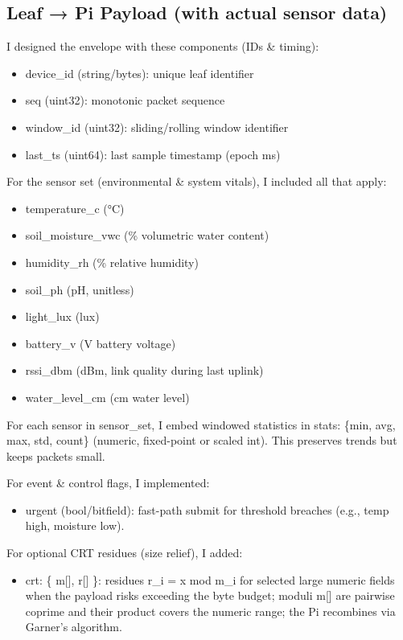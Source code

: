 \documentclass[12pt]{article}
\begin{document}
\subsection{Leaf → Pi Payload (with actual sensor data)}

I designed the envelope with these components (IDs \& timing):

\begin{itemize}
\item device\_id (string/bytes): unique leaf identifier
\item seq (uint32): monotonic packet sequence
\item window\_id (uint32): sliding/rolling window identifier
\item last\_ts (uint64): last sample timestamp (epoch ms)
\end{itemize}

For the sensor set (environmental \& system vitals), I included all that apply:

\begin{itemize}
\item temperature\_c (°C)
\item soil\_moisture\_vwc (\% volumetric water content)
\item humidity\_rh (\% relative humidity)
\item soil\_ph (pH, unitless)
\item light\_lux (lux)
\item battery\_v (V battery voltage)
\item rssi\_dbm (dBm, link quality during last uplink)
\item water\_level\_cm (cm water level)
\end{itemize}

For each sensor in sensor\_set, I embed windowed statistics in stats:  
\{min, avg, max, std, count\} (numeric, fixed-point or scaled int). This preserves trends but keeps packets small.

For event \& control flags, I implemented:

\begin{itemize}
\item urgent (bool/bitfield): fast-path submit for threshold breaches (e.g., temp high, moisture low).
\end{itemize}

For optional CRT residues (size relief), I added:

\begin{itemize}
\item crt: \{ m[], r[] \}: residues r\_i = x mod m\_i for selected large numeric fields when the payload risks exceeding the byte budget; moduli m[] are pairwise coprime and their product covers the numeric range; the Pi recombines via Garner's algorithm.
\end{itemize}
\end{document}
